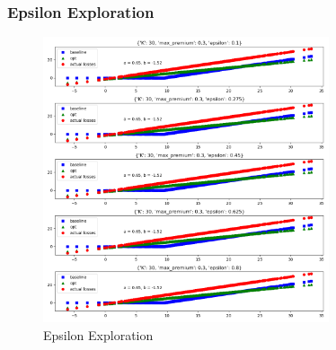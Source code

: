 \documentclass[11pt]{article}
\begin{document}

        \FloatBarrier

        \subsubsection*{Epsilon Exploration}
            \begin{figure}[H]
                \centering
                \caption{Epsilon Exploration}
                \includegraphics[width=0.75\textwidth]{../../output/figures/CVaR3/epsilon_exploration.png}
            \end{figure}


            \FloatBarrier
\end{document}
